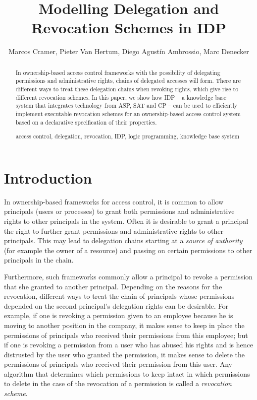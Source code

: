 \documentclass[runningheads]{llncs}
\newcommand{\keywords}[1]{\par\addvspace\baselineskip
\noindent\keywordname\enspace\ignorespaces#1}
\begin{document}
\mainmatter  
\title{Modelling Delegation and Revocation Schemes in IDP}


\author{Marcos Cramer, Pieter Van Hertum, Diego Agust\'{i}n Ambrossio, Marc Denecker}



\maketitle

\begin{abstract}
In ownership-based access control frameworks with the possibility of delegating permissions and administrative rights, chains of delegated accesses will form. There are different ways to treat these delegation chains when revoking rights, which give rise to different revocation schemes. In this paper, we show how IDP -- a knowledge base system that integrates technology from ASP, SAT and CP -- can be used to efficiently implement executable revocation schemes for an ownership-based access control system based on a declarative specification of their properties.
\keywords{access control, delegation, revocation, IDP, logic programming, \linebreak knowledge base system}
\end{abstract}

\section{Introduction}

In ownership-based frameworks for access control, it is common to allow principals (users or processes) to grant both permissions and administrative rights to other principals in the system. Often it is desirable to grant a principal the right to further grant permissions and administrative rights to other principals. This may lead to delegation chains starting at a \emph{source of authority} (for example the owner of a resource) and passing on certain permissions to other principals in the chain. 

Furthermore, such frameworks commonly allow a principal to revoke a permission that she granted to another principal. Depending on the reasons for the revocation, different ways to treat the chain of principals whose permissions depended on the second principal's delegation rights can be desirable. For example, if one is revoking a permission given to an employee because he is moving to another position in the company, it makes sense to keep in place the permissions of principals who received their permissions from this employee; but if one is revoking a permission from a user who has abused his rights and is hence distrusted by the user who granted the permission, it makes sense to delete the permissions of principals who received their permission from this user. Any algorithm that determines which permissions to keep intact in which permissions to delete in the case of the revocation of a permission is called a \emph{revocation scheme}.
\end{document}
